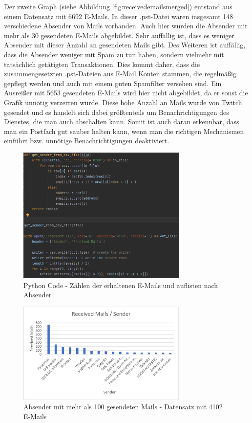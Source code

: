 Der zweite Graph (siehe Abbildung \ref{fig:receivedemailsmerged}) entstand aus einem Datensatz mit 6692 E-Mails. In dieser .pst-Datei waren insgesamt 148 verschiedene Absender von Mails vorhanden. Auch hier wurden die Absender mit mehr als 30 gesendeten E-Mails abgebildet. Sehr auffällig ist, dass es weniger Absender mit dieser Anzahl an gesendeten Mails gibt. Des Weiteren ist auffällig, dass die Absender weniger mit Spam zu tun haben, sondern vielmehr mit tatsächlich getätigten Transaktionen. Dies kommt daher, dass die zusammengesetzten .pst-Dateien aus E-Mail Konten stammen, die regelmäßig gepflegt werden und auch mit einem guten Spamfilter versehen sind. Ein Ausreißer mit 5653 gesendeten E-Mails wird hier nicht abgebildet, da er sonst die Grafik unnötig verzerren würde. Diese hohe Anzahl an Mails wurde von \glqq{}Twitch\grqq{} gesendet und es handelt sich dabei größtenteils um Benachrichtigungen des Dienstes, die man auch abschalten kann. Somit ist auch daran erkennbar, dass man ein Postfach gut sauber halten kann, wenn man die richtigen Mechanismen einführt bzw. unnötige Benachrichtigungen deaktiviert.



\begin{figure}
    \centering
    \includegraphics[width=0.75\textwidth]{images/Count_Received_Mails_Count_Sender.PNG}
    \caption{Python Code - Zählen der erhaltenen E-Mails und auflisten nach Absender} 
    \label{fig:countemailssender}
\end{figure}

\begin{figure}
    \centering
    \includegraphics[width=0.75\textwidth]{images/Auswertung_Empfange_Emails.png}
    \caption{Absender mit mehr als 100 gesendeten Mails - Datensatz mit 4102 E-Mails} 
    \label{fig:receivedemails}
\end{figure}

